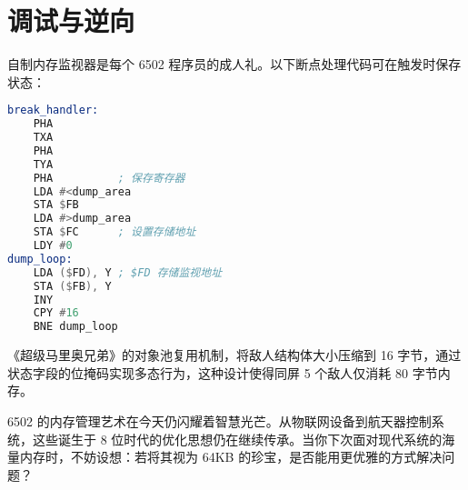 \chapter{调试与逆向}
自制内存监视器是每个 6502 程序员的成人礼。以下断点处理代码可在触发时保存状态：\par
\begin{lstlisting}[language=asm]
break_handler:
    PHA
    TXA
    PHA
    TYA
    PHA          ; 保存寄存器
    LDA #<dump_area
    STA $FB
    LDA #>dump_area
    STA $FC      ; 设置存储地址
    LDY #0
dump_loop:
    LDA ($FD), Y ; $FD 存储监视地址
    STA ($FB), Y
    INY
    CPY #16
    BNE dump_loop
\end{lstlisting}
《超级马里奥兄弟》的对象池复用机制，将敌人结构体大小压缩到 16 字节，通过状态字段的位掩码实现多态行为，这种设计使得同屏 5 个敌人仅消耗 80 字节内存。\par
6502 的内存管理艺术在今天仍闪耀着智慧光芒。从物联网设备到航天器控制系统，这些诞生于 8 位时代的优化思想仍在继续传承。当你下次面对现代系统的海量内存时，不妨设想：若将其视为 64KB 的珍宝，是否能用更优雅的方式解决问题？\par

